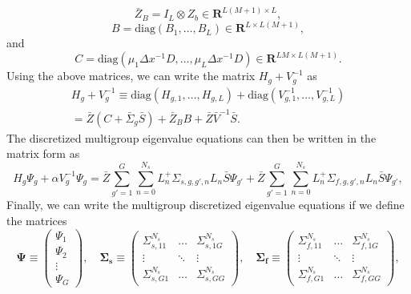 \begin{equation}
	\bar{Z}_{B} = I_{L} \otimes Z_{b} \in \mathbf{R}^{L(M+1) \times L},
\end{equation}
\begin{equation}
	B = \text{diag}(B_{1}, \dots, B_{L}) \in \mathbf{R}^{L \times L(M+1)},
\end{equation}
and
\begin{equation}
	C = \text{diag}(\mu_{1}\Delta x^{-1}D, \dots, \mu_{L} \Delta x^{-1}D) \in \mathbf{R}^{LM \times L(M+1)}.
\end{equation}
Using the above matrices, we can write the matrix $H_{g} + V^{-1}_{g}$ as
\begin{multline}
H_{g} + V^{-1}_{g} \equiv \text{diag}(H_{g,1}, \dots, H_{g,L}) + \text{diag}(V^{-1}_{g,1}, \dots, V^{-1}_{g,L}) \\ = \bar{Z}(C + \bar{\Sigma}_{g}\bar{S}) + \bar{Z}_{B}B + \bar{Z}\bar{V}^{-1}\bar{S}.
\end{multline}
The discretized multigroup eigenvalue equations can then be written in the matrix form as
\begin{equation}
	H_{g} \Psi_{g} + \alpha V^{-1}_{g}\Psi_{g} = \bar{Z} \sum_{g'=1}^{G} \sum_{n=0}^{N_{s}} L_{n}^{+}\Sigma_{s,g,g',n}L_{n}\bar{S}\Psi_{g'}  +  \bar{Z} \sum_{g'=1}^{G} \sum_{n=0}^{N_{s}} L_{n}^{+}\Sigma_{f,g,g',n}L_{n}\bar{S}\Psi_{g'}, 
	\label{eq:AlphaMGg}
\end{equation}
Finally, we can write the multigroup discretized eigenvalue equations if we define the matrices
\begin{equation}
	\mathbf{\Psi} \equiv \begin{pmatrix}
					\Psi_{1} \\
					\Psi_{2} \\
					\vdots \\
					\Psi_{G}
				       \end{pmatrix}, \quad
	\mathbf{\Sigma_{s}} \equiv \begin{pmatrix}
					\Sigma_{s, 11}^{N_{s}} & \dots & \Sigma_{s,1G}^{N_{s}} \\
					\vdots & \ddots & \vdots \\
					\Sigma_{s, G1}^{N_{s}} & \dots & \Sigma_{s,GG}^{N_{s}}
					\end{pmatrix}, \quad 
	\mathbf{\Sigma_{f}} \equiv \begin{pmatrix}
					\Sigma_{f, 11}^{N_{s}} & \dots & \Sigma_{f,1G}^{N_{s}} \\
					\vdots & \ddots & \vdots \\
					\Sigma_{f, G1}^{N_{s}} & \dots & \Sigma_{f,GG}^{N_{s}}
					\end{pmatrix},
\end{equation}
